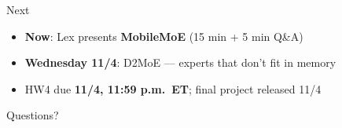 \begin{frame}{Next}
  \vspace{0.9em}
  \raggedright
  \begin{itemize}\itemsep8pt
    \item \textbf{Now}: Lex presents \textbf{MobileMoE} (15 min + 5 min Q\&A)
    \item \textbf{Wednesday 11/4}: D2MoE --- experts that don't fit in memory
    \item HW4 due \textbf{11/4, 11:59 p.m.\ ET}; final project released 11/4
  \end{itemize}

  \vspace{1.2em}
  \centering
  {\large Questions?}
\end{frame}

